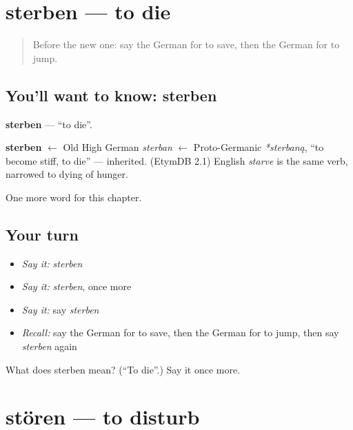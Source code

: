 \section[sterben]{sterben — to die}

\label{lesson:GE-C150-sterben}



\begin{quote}
Before the new one: say the German for to save, then the German for to jump.
\end{quote}

\subsection*{You'll want to know: sterben}
\textbf{sterben} — \textquotedblleft{}to die\textquotedblright{}.

\begin{cousinweb}
\textbf{sterben} $\leftarrow$ Old High German \emph{sterban} $\leftarrow$ Proto-Germanic \emph{*sterbaną}, \textquotedblleft{}to become stiff, to die\textquotedblright{} — inherited. (EtymDB 2.1) English \emph{starve} is the same verb, narrowed to dying of hunger.
\end{cousinweb}

\begin{grammarlens}[title={What you've built}]
One more word for this chapter.
\end{grammarlens}

\subsection*{Your turn}
\begin{itemize}
\raggedright
  \item \emph{Say it:} \emph{sterben}
  \item \emph{Say it:} \emph{sterben}, once more
  \item \emph{Say it:} say \emph{sterben}
  \item \emph{Recall:} say the German for to save, then the German for to jump, then say \emph{sterben} again
\end{itemize}

\begin{tcolorbox}[breakable,colback=teal!4,colframe=teal!35!black,title={Before you move on}]
What does sterben mean? (\textquotedblleft{}To die\textquotedblright{}.) Say it once more.
\end{tcolorbox}
\section[stören]{stören — to disturb}

